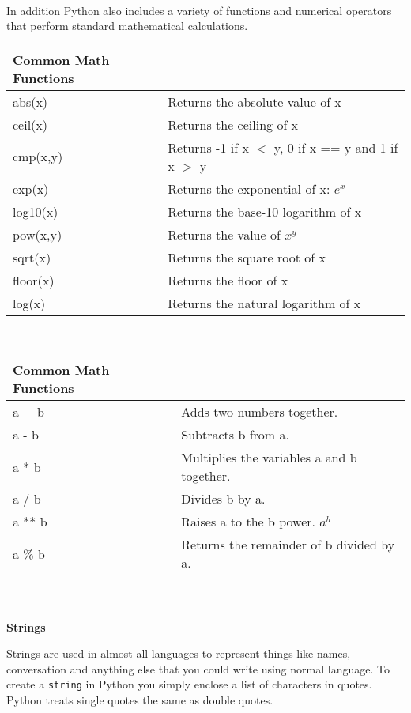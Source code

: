\documentclass[letterpaper,11pt]{article}
\begin{document}
\\
\par{In addition Python also includes a variety of functions and numerical
operators that perform standard mathematical calculations.}
\\
\begin{tabular}[t]{l l}
    \textbf{Common Math Functions} &                               \\
    \hline
    abs(x)   & Returns the absolute value of x                     \\
    ceil(x)  & Returns the ceiling of x                            \\
    cmp(x,y) & Returns -1 if x $<$ y, 0 if x == y and 1 if x $>$ y \\
    exp(x)   & Returns the exponential of x: $e^x$                 \\
    log10(x) & Returns the base-10 logarithm of x                  \\
    pow(x,y) & Returns the value of $x^y$                          \\
    sqrt(x)  & Returns the square root of x                        \\
    floor(x) & Returns the floor of x                              \\
    log(x)   & Returns the natural logarithm of x                  \\
\end{tabular}
\\
\begin{tabular}[t]{l l}
    \textbf{Common Math Functions} &                               \\
    \hline
    a + b  & Adds two numbers together.                 \\
    a - b  & Subtracts b from a.                        \\
    a * b  & Multiplies the variables a and b together. \\
    a / b  & Divides b by a.                            \\
    a ** b & Raises a to the b power. $a^b$             \\
    a \% b & Returns the remainder of b divided by a.   \\
\end{tabular}
\\ \\
\textbf{Strings}
\par{Strings are used in almost all languages to represent things like names,
conversation and anything else that you could write using normal language. To
create a \texttt{string} in Python you simply enclose a list of characters in
quotes. Python treats single quotes the same as double quotes.}
\end{document}
